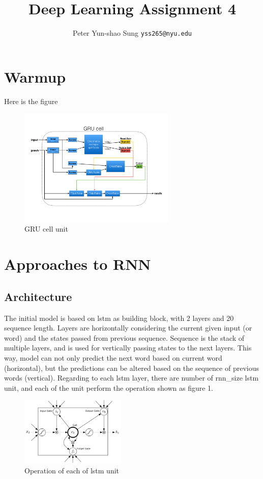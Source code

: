 \documentclass{article}
\title{Deep Learning Assignment 4}
\author{
  Peter Yun-shao Sung
  \texttt{yss265@nyu.edu} \\
}
\begin{document}

\maketitle
\section{Warmup}
Here is the figure

\begin{figure}[h]
\centering
\includegraphics[width=75mm]{../q2/q2.png}
  \caption{GRU cell unit}
\end{figure}

\section{Approaches to RNN}
\subsection{Architecture}
The initial model is based on lstm as building block, with 2 layers and 20 sequence length. Layers are horizontally considering the current given input (or word) and the states passed from previous sequence. Sequence is the stack of multiple layers, and is used for vertically passing states to the next layers. This way, model can not only predict the next word based on current word (horizontal), but the predictions can be altered based on the sequence of previous words (vertical). Regarding to each lstm layer, there are number of rnn\_size lstm unit, and each of the unit perform the operation shown as figure 1.

\begin{figure}[h]
\centering
\includegraphics[width=50mm]{./fig/lstm.png}
  \caption{Operation of each of lstm unit}
\end{figure}
\end{document}
